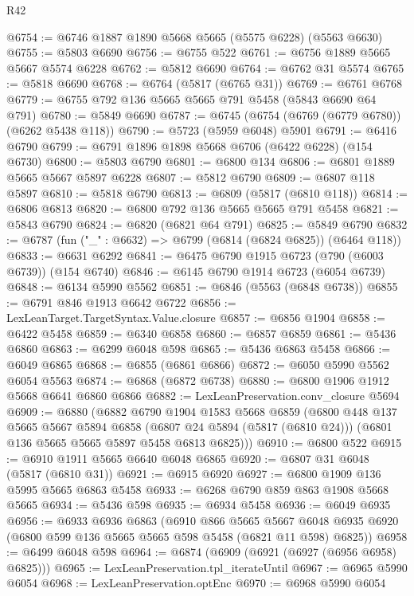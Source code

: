 \begin{lexlean}{R42}
\begin{coremodule}
@6754 := @6746 @1887 @1890 @5668 @5665 (@5575 @6228) (@5563 @6630)
@6755 := @5803 @6690
@6756 := @6755 @522
@6761 := @6756 @1889 @5665 @5667 @5574 @6228
@6762 := @5812 @6690
@6764 := @6762 @31 @5574
@6765 := @5818 @6690
@6768 := @6764 (@5817 (@6765 @31))
@6769 := @6761 @6768
@6779 := @6755 @792 @136 @5665 @5665 @791 @5458 (@5843 @6690 @64 @791)
@6780 := @5849 @6690
@6787 := @6745 (@6754 (@6769 (@6779 @6780)) (@6262 @5438 @118))
@6790 := @5723 (@5959 @6048) @5901
@6791 := @6416 @6790
@6799 := @6791 @1896 @1898 @5668 @6706 (@6422 @6228) (@154 @6730)
@6800 := @5803 @6790
@6801 := @6800 @134
@6806 := @6801 @1889 @5665 @5667 @5897 @6228
@6807 := @5812 @6790
@6809 := @6807 @118 @5897
@6810 := @5818 @6790
@6813 := @6809 (@5817 (@6810 @118))
@6814 := @6806 @6813
@6820 := @6800 @792 @136 @5665 @5665 @791 @5458
@6821 := @5843 @6790
@6824 := @6820 (@6821 @64 @791)
@6825 := @5849 @6790
@6832 := @6787 (fun ("_" : @6632) => @6799 (@6814 (@6824 @6825)) (@6464 @118))
@6833 := @6631 @6292
@6841 := @6475 @6790 @1915 @6723 (@790 (@6003 @6739)) (@154 @6740)
@6846 := @6145 @6790 @1914 @6723 (@6054 @6739)
@6848 := @6134 @5990 @5562
@6851 := @6846 (@5563 (@6848 @6738))
@6855 := @6791 @846 @1913 @6642 @6722
@6856 := LexLeanTarget.TargetSyntax.Value.closure
@6857 := @6856 @1904
@6858 := @6422 @5458
@6859 := @6340 @6858
@6860 := @6857 @6859
@6861 := @5436 @6860
@6863 := @6299 @6048 @598
@6865 := @5436 @6863 @5458
@6866 := @6049 @6865
@6868 := @6855 (@6861 @6866)
@6872 := @6050 @5990 @5562 @6054 @5563
@6874 := @6868 (@6872 @6738)
@6880 := @6800 @1906 @1912 @5668 @6641 @6860 @6866
@6882 := LexLeanPreservation.conv_closure @5694
@6909 := @6880
    (@6882
      @6790
      @1904
      @1583
      @5668
      @6859
      (@6800
        @448
        @137
        @5665
        @5667
        @5894
        @6858
        (@6807 @24 @5894 (@5817 (@6810 @24)))
        (@6801 @136 @5665 @5665 @5897 @5458 @6813 @6825)))
@6910 := @6800 @522
@6915 := @6910 @1911 @5665 @6640 @6048 @6865
@6920 := @6807 @31 @6048 (@5817 (@6810 @31))
@6921 := @6915 @6920
@6927 := @6800 @1909 @136 @5995 @5665 @6863 @5458
@6933 := @6268 @6790 @859 @863 @1908 @5668 @5665
@6934 := @5436 @598
@6935 := @6934 @5458
@6936 := @6049 @6935
@6956 := @6933
    @6936
    @6863
    (@6910
      @866
      @5665
      @5667
      @6048
      @6935
      @6920
      (@6800 @599 @136 @5665 @5665 @598 @5458 (@6821 @11 @598) @6825))
@6958 := @6499 @6048 @598
@6964 := @6874 (@6909 (@6921 (@6927 (@6956 @6958) @6825)))
@6965 := LexLeanPreservation.tpl_iterateUntil
@6967 := @6965 @5990 @6054
@6968 := LexLeanPreservation.optEnc
@6970 := @6968 @5990 @6054

\end{coremodule}
\end{lexlean}
